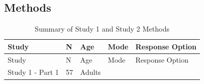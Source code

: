 \documentclass[oneside]{report}
\theoremstyle{definition}
\theoremstyle{definition}
\theoremstyle{definition}
\theoremstyle{remark}
\begin{document}
\subsection{Methods}\label{methods-1}
\begin{longtable}[]{@{}lllll@{}}
\caption{\label{tab:study2info} Summary of Study 1 and Study 2
Methods}\tabularnewline
\toprule
\begin{minipage}[b]{0.17\columnwidth}\raggedright\strut
Study\strut
\end{minipage} & \begin{minipage}[b]{0.08\columnwidth}\raggedright\strut
N\strut
\end{minipage} & \begin{minipage}[b]{0.16\columnwidth}\raggedright\strut
Age\strut
\end{minipage} & \begin{minipage}[b]{0.15\columnwidth}\raggedright\strut
Mode\strut
\end{minipage} & \begin{minipage}[b]{0.31\columnwidth}\raggedright\strut
Response Option\strut
\end{minipage}\tabularnewline
\midrule
\endfirsthead
\toprule
\begin{minipage}[b]{0.17\columnwidth}\raggedright\strut
Study\strut
\end{minipage} & \begin{minipage}[b]{0.08\columnwidth}\raggedright\strut
N\strut
\end{minipage} & \begin{minipage}[b]{0.16\columnwidth}\raggedright\strut
Age\strut
\end{minipage} & \begin{minipage}[b]{0.15\columnwidth}\raggedright\strut
Mode\strut
\end{minipage} & \begin{minipage}[b]{0.31\columnwidth}\raggedright\strut
Response Option\strut
\end{minipage}\tabularnewline
\midrule
\endhead
\begin{minipage}[t]{0.17\columnwidth}\raggedright\strut
Study 1 - Part 1\strut
\end{minipage} & \begin{minipage}[t]{0.08\columnwidth}\raggedright\strut
57\strut
\end{minipage} & \begin{minipage}[t]{0.16\columnwidth}\raggedright\strut
Adults\strut
\end{minipage} & \begin{minipage}[t]{0.15\columnwidth}\raggedright\strut

\end{minipage}
\end{longtable}
\end{document}

